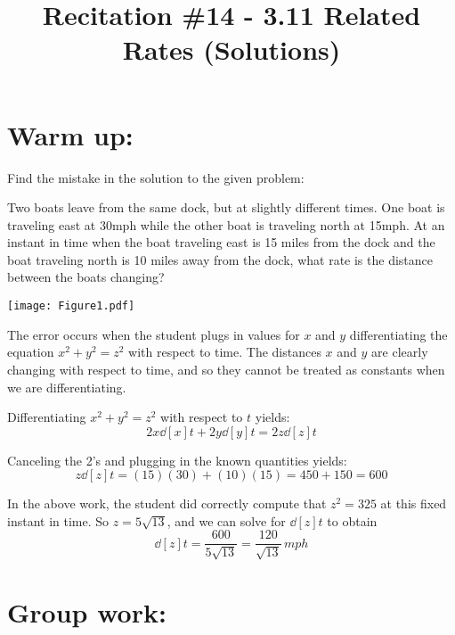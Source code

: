 \documentclass[nooutcomes]{ximera}
\title{Recitation \#14 - 3.11 Related Rates (Solutions)}
\begin{document}
\begin{abstract}		\end{abstract}
\maketitle

\section*{Warm up:} 
Find the mistake in the solution to the given problem:

Two boats leave from the same dock, but at slightly different times.  One boat is traveling east at 30mph while the other boat is traveling north at 15mph.  At an instant in time when the boat traveling east is 15 miles from the dock and the boat traveling north is 10 miles away from the dock, what rate is the distance between the boats changing?

	\begin{image}
	\texttt{[image: Figure1.pdf]}
	\end{image}
	
		\begin{freeResponse}
		The error occurs when the student plugs in values for $x$ and $y$  differentiating the equation $x^2 + y^2 = z^2$ with respect to time.  The distances $x$ and $y$ are clearly changing with respect to time, and so they cannot be treated as constants when we are differentiating.
		
		Differentiating $x^2 + y^2 = z^2$ with respect to $t$ yields:
		$$ 2x \dd[x]{t} + 2y \dd[y]{t} = 2z \dd[z]{t}$$
		
		Canceling the 2's and plugging in the known quantities yields:
		$$ z \dd[z]{t} = (15)(30) + (10)(15) = 450 + 150 = 600 $$
		
		In the above work, the student did correctly compute that $z^2 = 325$ at this fixed instant in time.  So $z = 5\sqrt{13}$, and we can solve for $\dd[z]{t}$ to obtain
		$$ \dd[z]{t} = \frac{600}{5 \sqrt{13}} = \frac{120}{\sqrt{13}} \, mph $$
		\end{freeResponse}	
		
		
		

	
	
	
	
	

\section*{Group work:}
\end{document}
